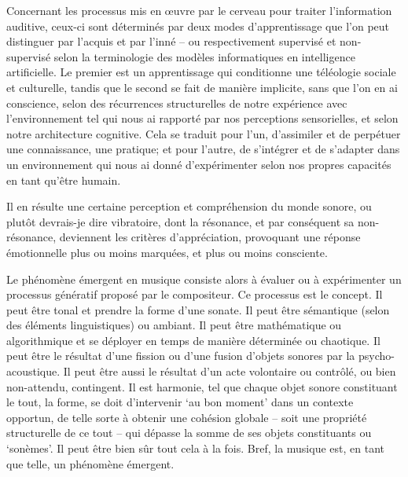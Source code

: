 \documentclass{article}
\begin{document}
Concernant les processus mis en œuvre par le cerveau pour traiter l'information auditive, ceux-ci sont déterminés par deux modes d'apprentissage que l'on peut distinguer par l'acquis et par l'inné -- ou respectivement supervisé et non-supervisé selon la terminologie des modèles informatiques en intelligence artificielle. Le premier est un apprentissage qui conditionne une téléologie sociale et culturelle, tandis que le second se fait de manière implicite, sans que l'on en ai conscience, selon des récurrences structurelles de notre expérience avec l'environnement tel qui nous ai rapporté par nos perceptions sensorielles, et selon notre architecture cognitive. Cela se traduit pour l'un, d'assimiler et de perpétuer une connaissance, une pratique; et pour l'autre, de s'intégrer et de s'adapter dans un environnement qui nous ai donné d'expérimenter selon nos propres capacités en tant qu'être humain.

Il en résulte une certaine perception et compréhension du monde sonore, ou plutôt devrais-je dire vibratoire, dont la résonance, et par conséquent sa non-résonance, deviennent les critères d'appréciation, provoquant une réponse émotionnelle plus ou moins marquées, et plus ou moins consciente.

\bigskip

Le phénomène émergent en musique consiste alors à évaluer ou à expérimenter un processus génératif proposé par le compositeur. Ce processus est le concept. Il peut être tonal et prendre la forme d'une sonate. Il peut être sémantique (selon des éléments linguistiques) ou ambiant. Il peut être mathématique ou algorithmique et se déployer en temps de manière déterminée ou chaotique. Il peut être le résultat d'une fission ou d'une fusion d'objets sonores par la psycho-acoustique. Il peut être aussi le résultat d'un acte volontaire ou contrôlé, ou bien non-attendu, contingent. Il est harmonie, tel que chaque objet sonore constituant le tout, la forme, se doit d'intervenir `au bon moment' dans un contexte opportun, de telle sorte à obtenir une cohésion globale -- soit une propriété structurelle de ce tout -- qui dépasse la somme de ses objets constituants ou `sonèmes'. Il peut être bien sûr tout cela à la fois. Bref, la musique est, en tant que telle, un phénomène émergent.
\end{document}
